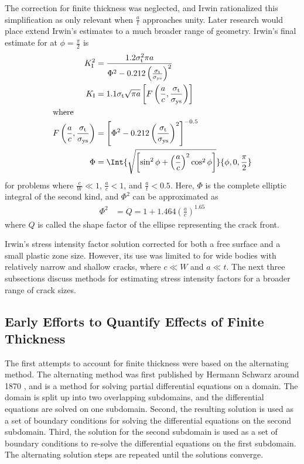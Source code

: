 The correction for finite thickness was neglected, and Irwin rationalized this simplification as only relevant when \(\frac{a}{t}\) approaches unity.
Later research would place extend Irwin's estimates to a much broader range of geometry.
Irwin's final estimate for \KI at \(\phi=\frac{\pi}{2}\) is
\begin{align}
\KI^2 &= \frac{1.2 \St^2 \pi a}{\Phi^2 - 0.212 \left(\frac{\St}{\Sys}\right)^2} \\
\KI   &= 1.1 \St \sqrt{\pi a} \left[ F \left(\frac{a}{c},\frac{\St}{\Sys}\right) \right]\\
      \intertext{where}
F\left(\frac{a}{c},\frac{\St}{\Sys}\right) &= \left[\Phi^2 - 0.212 \left(\frac{\St}{\Sys}\right)^2\right]^{-0.5} \\
\Phi &= \Int{\sqrt{\left[ \sin^2 \phi + \left(\frac{a}{c}\right)^2 \cos^2 \phi \right]}}{\phi,0,\frac{\pi}{2}}
\end{align}
for problems where \(\frac{c}{W} \ll 1\), \(\frac{a}{c} < 1\), and \(\frac{a}{t} < 0.5\).
Here, \(\Phi\) is the complete elliptic integral of the second kind, and \(\Phi^2\) can be approximated as
\begin{align}
\Phi^2 &= Q = 1 + 1.464 \left( \frac{a}{c} \right)^{1.65} \label{eq:shape-factor}
\end{align}
where \(Q\) is called the shape factor of the ellipse representing the crack front.

Irwin's stress intensity factor solution corrected for both a free surface and a small plastic zone size.
However, its use was limited to for wide bodies with relatively narrow and shallow cracks, where \(c \ll W\) and \(a \ll t\).
The next three subsections discuss methods for estimating stress intensity factors for a broader range of crack sizes.

\subsection{Early Efforts to Quantify Effects of Finite Thickness}
The first attempts to account for finite thickness were based on the alternating method.
The alternating method was first published by Hermann Schwarz around 1870 \citep{schwarzbiography}, and is a method for solving partial differential equations on a domain.
The domain is split up into two overlapping subdomains, and the differential equations are solved on one subdomain.
Second, the resulting solution is used as a set of boundary conditions for solving the differential equations on the second subdomain.
Third, the solution for the second subdomain is used as a set of boundary conditions to re-solve the differential equations on the first subdomain.
The alternating solution steps are repeated until the solutions converge.

